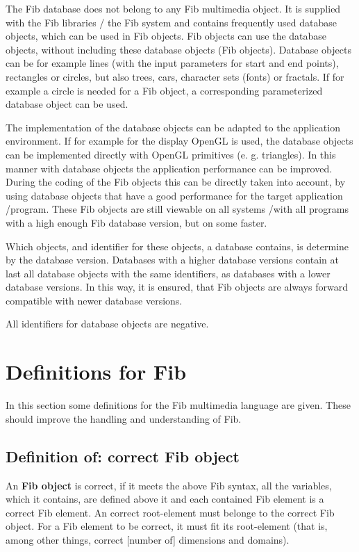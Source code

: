 The Fib database does not belong to any Fib multimedia object. It is supplied with the Fib libraries / the Fib system and contains frequently used database objects, which can be used in Fib objects. Fib objects can use the database objects, without including these database objects (Fib objects). Database objects can be for example lines (with the input parameters for start and end points), rectangles or circles, but also trees, cars, character sets (fonts) or fractals. If for example a circle is needed for a Fib object, a corresponding parameterized database object can be used.

The implementation of the database objects can be adapted to the application environment. If for example for the display OpenGL is used, the database objects can be implemented directly with OpenGL primitives (e. g. triangles). In this manner with database objects the application performance can be improved. During the coding of the Fib objects this can be directly taken into account, by using database objects that have a good performance for the target application /program. These Fib objects are still viewable on all systems /with all programs with a high enough Fib database version, but on some faster.

Which objects, and identifier for these objects, a database contains, is determine by the database version. Databases with a higher database versions contain at last all database objects with the same identifiers, as databases with a lower database versions. In this way, it is ensured, that Fib objects are always forward compatible with newer database versions.

All identifiers for database objects are negative.




\section{Definitions for Fib}
\label{secDefinitionsForFib}

In this section some definitions for the Fib multimedia language are given. These should improve the handling and understanding of Fib.


\subsection{Definition of: correct Fib object}

An \textbf{Fib object} is correct, if it meets the above Fib syntax, all the variables, which it contains, are defined above it and each contained Fib element is a correct Fib element. An correct root-element must belonge to the correct Fib object. For a Fib element to be correct, it must fit its root-element (that is, among other things, correct [number of] dimensions and domains).

